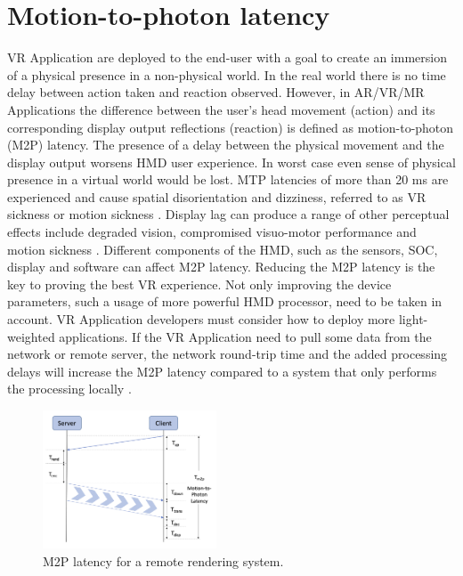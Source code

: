 \section{Motion-to-photon latency}
\label{sec:theorie:m2p}
VR Application are deployed to the end-user with a goal to create an immersion of a physical presence in a non-physical world. In the real world there is no time delay between action taken and reaction observed. However, in AR/VR/MR Applications the difference between the user's head movement (action) and its corresponding display output reflections (reaction) is defined as motion-to-photon (M2P) latency. The presence of a delay between the physical movement and the display output worsens HMD user experience. In worst case even sense of physical presence in a virtual world would be lost. MTP latencies of more than 20 ms are experienced and cause spatial disorientation and dizziness, referred to as VR sickness or motion sickness \cite{delay_sickness, serhan_kalman}. Display lag can produce a range of other perceptual effects include degraded vision, compromised visuo-motor performance and motion sickness \cite{delay_sickness}. Different components of the HMD, such as the sensors, SOC, display and software can affect M2P latency. Reducing the M2P latency is the key to proving the best VR experience. Not only improving the device parameters, such a usage of more powerful HMD processor, need to be taken in account. VR Application developers must consider how to deploy more light-weighted applications. If the VR Application need to pull some data from the network or remote server, the network round-trip time and the added processing delays will increase the M2P latency compared to a system that only performs the processing locally \cite{serhan_kalman}.

\begin{figure}
	\centering
	\includegraphics[width=0.46\textwidth]{gfx/m2p.png}
	\caption{\label{fig:m2p}M2P latency for a remote rendering system.}
\end{figure}

